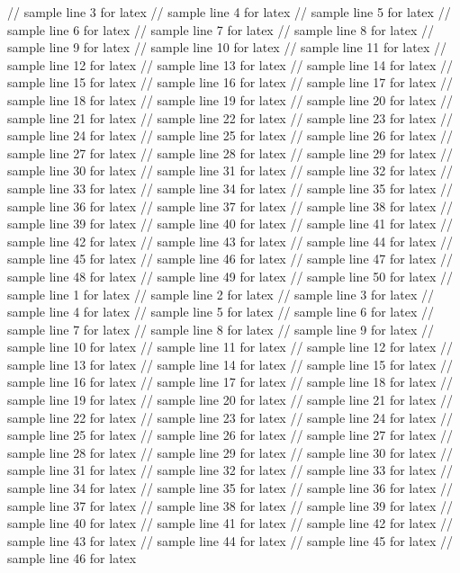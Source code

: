 // sample line 3 for latex
// sample line 4 for latex
// sample line 5 for latex
// sample line 6 for latex
// sample line 7 for latex
// sample line 8 for latex
// sample line 9 for latex
// sample line 10 for latex
// sample line 11 for latex
// sample line 12 for latex
// sample line 13 for latex
// sample line 14 for latex
// sample line 15 for latex
// sample line 16 for latex
// sample line 17 for latex
// sample line 18 for latex
// sample line 19 for latex
// sample line 20 for latex
// sample line 21 for latex
// sample line 22 for latex
// sample line 23 for latex
// sample line 24 for latex
// sample line 25 for latex
// sample line 26 for latex
// sample line 27 for latex
// sample line 28 for latex
// sample line 29 for latex
// sample line 30 for latex
// sample line 31 for latex
// sample line 32 for latex
// sample line 33 for latex
// sample line 34 for latex
// sample line 35 for latex
// sample line 36 for latex
// sample line 37 for latex
// sample line 38 for latex
// sample line 39 for latex
// sample line 40 for latex
// sample line 41 for latex
// sample line 42 for latex
// sample line 43 for latex
// sample line 44 for latex
// sample line 45 for latex
// sample line 46 for latex
// sample line 47 for latex
// sample line 48 for latex
// sample line 49 for latex
// sample line 50 for latex
// sample line 1 for latex
// sample line 2 for latex
// sample line 3 for latex
// sample line 4 for latex
// sample line 5 for latex
// sample line 6 for latex
// sample line 7 for latex
// sample line 8 for latex
// sample line 9 for latex
// sample line 10 for latex
// sample line 11 for latex
// sample line 12 for latex
// sample line 13 for latex
// sample line 14 for latex
// sample line 15 for latex
// sample line 16 for latex
// sample line 17 for latex
// sample line 18 for latex
// sample line 19 for latex
// sample line 20 for latex
// sample line 21 for latex
// sample line 22 for latex
// sample line 23 for latex
// sample line 24 for latex
// sample line 25 for latex
// sample line 26 for latex
// sample line 27 for latex
// sample line 28 for latex
// sample line 29 for latex
// sample line 30 for latex
// sample line 31 for latex
// sample line 32 for latex
// sample line 33 for latex
// sample line 34 for latex
// sample line 35 for latex
// sample line 36 for latex
// sample line 37 for latex
// sample line 38 for latex
// sample line 39 for latex
// sample line 40 for latex
// sample line 41 for latex
// sample line 42 for latex
// sample line 43 for latex
// sample line 44 for latex
// sample line 45 for latex
// sample line 46 for latex
